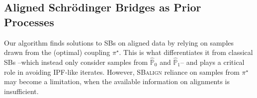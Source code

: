 \subsection{Aligned Schr\"odinger Bridges as Prior Processes}
\label{subsec:prior_drift}



Our algorithm finds solutions to SBs on aligned data by relying on samples drawn from the (optimal) coupling $\pi^\star$. This is what differentiates it from classical SBs --which instead only consider samples from $\hat{\mathbb{P}}_0$ and $\hat{\mathbb{P}}_1$-- and plays a critical role in avoiding IPF-like iterates. However, \textsc{SBalign} reliance on samples from $\pi^\star$ may become a limitation, when the available information on alignments is insufficient. 

